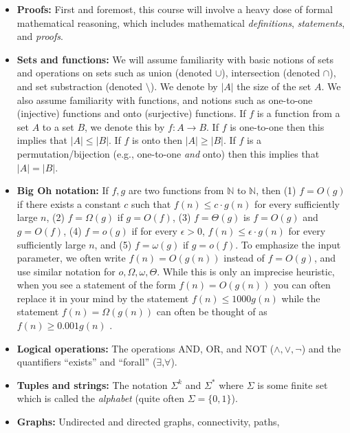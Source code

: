 \begin{itemize}
\item
  \textbf{Proofs:} First and foremost, this course will involve a heavy
  dose of formal mathematical reasoning, which includes mathematical
  \emph{definitions}, \emph{statements}, and \emph{proofs}.
\item
  \textbf{Sets and functions:} We will assume familiarity with basic
  notions of sets and operations on sets such as union (denoted
  \(\cup\)), intersection (denoted \(\cap\)), and set substraction
  (denoted \(\setminus\)). We denote by \(|A|\) the size of the set
  \(A\). We also assume familiarity with functions, and notions such as
  one-to-one (injective) functions and onto (surjective) functions. If
  \(f\) is a function from a set \(A\) to a set \(B\), we denote this by
  \(f:A\rightarrow B\). If \(f\) is one-to-one then this implies that
  \(|A| \leq |B|\). If \(f\) is onto then \(|A| \geq |B|\). If \(f\) is
  a permutation/bijection (e.g., one-to-one \emph{and} onto) then this
  implies that \(|A|=|B|\).
\item
  \textbf{Big Oh notation:} If \(f,g\) are two functions from
  \({\mathbb{N}}\) to \({\mathbb{N}}\), then (1) \(f = O(g)\) if there
  exists a constant \(c\) such that \(f(n) \leq c\cdot g(n)\) for every
  sufficiently large \(n\), (2) \(f = \Omega(g)\) if \(g=O(f)\), (3)
  \(f = \Theta(g)\) is \(f=O(g)\) and \(g=O(f)\), (4) \(f = o(g)\) if
  for every \(\epsilon>0\), \(f(n) \leq \epsilon \cdot g(n)\) for every
  sufficiently large \(n\), and (5) \(f = \omega(g)\) if \(g = o(f)\).
  To emphasize the input parameter, we often write \(f(n) = O(g(n))\)
  instead of \(f = O(g)\), and use similar notation for
  \(o,\Omega,\omega,\Theta\). While this is only an imprecise heuristic,
  when you see a statement of the form \(f(n)=O(g(n))\) you can often
  replace it in your mind by the statement \(f(n) \leq 1000g(n)\) while
  the statement \(f(n) = \Omega(g(n))\) can often be thought of as
  \(f(n)\geq 0.001g(n)\) .
\item
  \textbf{Logical operations:} The operations AND, OR, and NOT
  (\(\wedge,\vee,\neg\)) and the quantifiers ``exists'' and ``forall''
  (\(\exists\),\(\forall\)).
\item
  \textbf{Tuples and strings:} The notation \(\Sigma^k\) and
  \(\Sigma^*\) where \(\Sigma\) is some finite set which is called the
  \emph{alphabet} (quite often \(\Sigma = \{0,1\}\)).
\item
  \textbf{Graphs:} Undirected and directed graphs, connectivity, paths,

\end{itemize}
